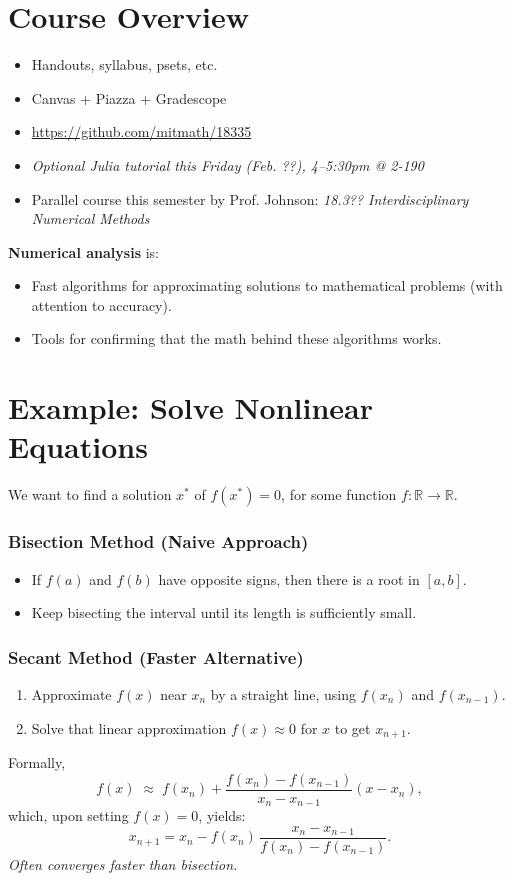 \section*{Course Overview}
\begin{itemize}
    \item Handouts, syllabus, psets, etc.
    \item Canvas + Piazza + Gradescope
    \item \url{https://github.com/mitmath/18335}
    \item \textit{Optional Julia tutorial this Friday (Feb. ??), 4--5:30pm @ 2-190}
    \item Parallel course this semester by Prof. Johnson: \textit{18.3?? Interdisciplinary Numerical Methods}
\end{itemize}

\noindent
\textbf{Numerical analysis} is:
\begin{itemize}
    \item Fast algorithms for approximating solutions to mathematical problems (with attention to accuracy).
    \item Tools for confirming that the math behind these algorithms works.
\end{itemize}

\section*{Example: Solve Nonlinear Equations}
We want to find a solution $x^*$ of $f(x^*) = 0$, for some function $f: \mathbb{R} \to \mathbb{R}$.

\subsubsection*{Bisection Method (Naive Approach)}
\begin{itemize}
    \item If $f(a)$ and $f(b)$ have opposite signs, then there is a root in $[a, b]$.
    \item Keep bisecting the interval until its length is sufficiently small.
\end{itemize}

\subsubsection*{Secant Method (Faster Alternative)}
\begin{enumerate}
    \item Approximate $f(x)$ near $x_n$ by a straight line, using $f(x_n)$ and $f(x_{n-1})$.
    \item Solve that linear approximation $f(x) \approx 0$ for $x$ to get $x_{n+1}$.
\end{enumerate}
Formally,
\[
f(x) \;\approx\; f(x_n) + \frac{f(x_n) - f(x_{n-1})}{x_n - x_{n-1}} (x - x_n),
\]
which, upon setting $f(x) = 0$, yields:
\[
x_{n+1} 
= x_n 
- f(x_n)\,\frac{x_n - x_{n-1}}{f(x_n) - f(x_{n-1})}.
\]
\textit{Often converges faster than bisection.}

